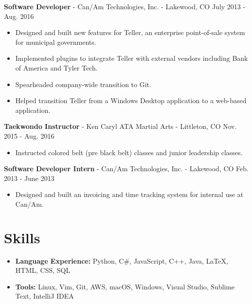 \documentclass[10pt,letterpaper]{article}
\begin{document}
\vspace{2pt}
\textbf{Software Developer} - Can/Am Technologies, Inc. - Lakewood, CO
\hfill July 2013 - Aug. 2016
\begin{itemize}
    \item Designed and built new features for Teller, an enterprise
        point-of-sale system for municipal governments.
    \item Implemented plugins to integrate Teller with external vendors
        including Bank of America and Tyler Tech.
    \item Spearheaded company-wide transition to Git.
    \item Helped transition Teller from a Windows Desktop application to a
        web-based application.
\end{itemize}

\vspace{2pt}
\textbf{Taekwondo Instructor} - Ken Caryl ATA Martial Arts - Littleton, CO
\hfill Nov. 2015 - Aug. 2016
\begin{itemize}
    \item Instructed colored belt (pre black belt) classes and junior leadership
        classes.
\end{itemize}

\vspace{2pt}
\textbf{Software Developer Intern} - Can/Am Technologies, Inc. - Lakewood, CO
\hfill Feb. 2013 - June 2013
\begin{itemize}
    \item Designed and built an invoicing and time tracking system for internal
        use at Can/Am.
\end{itemize}

\section*{Skills}
{\renewcommand\labelitemi{}
    \renewcommand\leftmargini{0pt}
    \begin{itemize}
        \item \textbf{Language Experience:} Python, C\#, JavaScript, C++, Java,
            {\selectfont\LaTeX}, HTML, CSS, SQL
        \item \textbf{Tools:} Linux, Vim, Git, AWS, macOS, Windows, Visual
            Studio, Sublime Text, IntelliJ IDEA
    \end{itemize}
}
\end{document}
